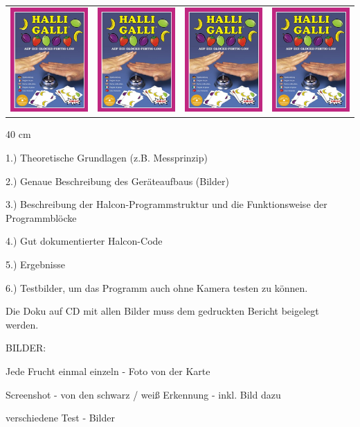 \begin{center}
\begin{tabular}{cccc}
  \includegraphics[width=3cm]{Abbildungen/Cover} & \includegraphics[width=3cm]{Abbildungen/Cover} & \includegraphics[width=3cm]{Abbildungen/Cover} & \includegraphics[width=3cm]{Abbildungen/Cover} \\ 
\end{tabular}

\end{center}

40 cm 


1.) Theoretische Grundlagen (z.B. Messprinzip)

2.) Genaue Beschreibung des Geräteaufbaus (Bilder)

3.) Beschreibung der Halcon-Programmstruktur und die Funktionsweise der Programmblöcke

4.) Gut dokumentierter Halcon-Code 

5.) Ergebnisse 

6.) Testbilder, um das Programm auch ohne Kamera testen zu können.

Die Doku auf CD mit allen Bilder muss dem gedruckten Bericht beigelegt werden.

BILDER:

Jede Frucht einmal einzeln - Foto von der Karte

Screenshot - von den schwarz / weiß Erkennung - inkl. Bild dazu 

verschiedene Test - Bilder
